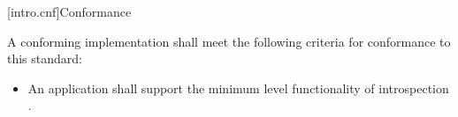 
[intro.cnf]{Conformance}

\pnum
A conforming implementation shall meet the following criteria for conformance
to this standard:

\begin{itemize}

\item An application shall support the minimum level functionality of
introspection .

\end{itemize}
